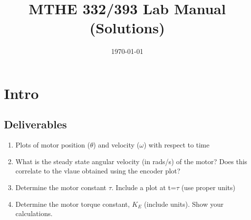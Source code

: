 \documentclass[letterpaper, 11pt, openany]{book}
\title{MTHE 332/393 Lab Manual (Solutions)}
\date{\today}
\begin{document}
\maketitle
\chapter{Intro}
\section{Deliverables}

\begin{enumerate}
\item Plots of motor position ($\theta$) and velocity ($\omega$) with respect to time
\item What is the steady state angular velocity (in rads/s) of the motor? 
Does this correlate to the vlaue obtained using the encoder plot?
\item Determine the motor constant $\tau$. Include a plot at t=$\tau$ (use proper units)
\item Determine the motor torque constant, $K_E$ (include units). Show your calculations.
\end{enumerate}
\end{document}
